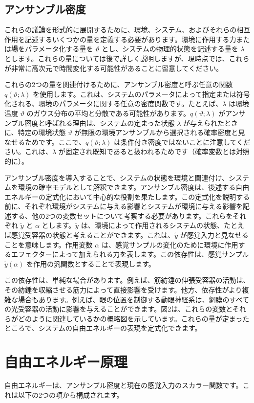 \documentclass{article}
\begin{document}
\subsection{アンサンブル密度}
これらの議論を形式的に展開するために、環境、システム、およびそれらの相互作用を記述するいくつかの量を定義する必要があります。環境に作用する力または場をパラメータ化する量を $\vartheta$ とし、システムの物理的状態を記述する量を $\lambda$ とします。これらの量については後で詳しく説明しますが、現時点では、これらが非常に高次元で時間変化する可能性があることに留意してください。

これらの2つの量を関連付けるために、アンサンブル密度と呼ぶ任意の関数 $q(\vartheta; \lambda)$ を使用します。これは、システムのパラメータによって指定または符号化される、環境のパラメータに関する任意の密度関数です。たとえば、$\lambda$ は環境温度 $\vartheta$ のガウス分布の平均と分散である可能性があります。$q(\vartheta; \lambda)$ がアンサンブル密度と呼ばれる理由は、システムの定まった状態 $\lambda$ が与えられたときに、特定の環境状態 $\vartheta$ が無限の環境アンサンブルから選択される確率密度と見なせるためです。ここで、$q(\vartheta; \lambda)$ は条件付き密度ではないことに注意してください。これは、$\lambda$ が固定され既知であると扱われるためです（確率変数とは対照的に）。

アンサンブル密度を導入することで、システムの状態を環境と関連付け、システムを環境の確率モデルとして解釈できます。アンサンブル密度は、後述する自由エネルギーの定式化において中心的な役割を果たします。この定式化を説明する前に、それぞれ環境がシステムに与える影響とシステムが環境に与える影響を記述する、他の2つの変数セットについて考察する必要があります。これらをそれぞれ $\tilde{y}$ と $\alpha$ とします。$\tilde{y}$ は、環境によって作用されるシステムの状態、たとえば感覚受容器の状態と考えることができます。これは、$\tilde{y}$ が感覚入力と見なせることを意味します。作用変数 $\alpha$ は、感覚サンプルの変化のために環境に作用するエフェクターによって加えられる力を表します。この依存性は、感覚サンプル $\tilde{y}(\alpha)$ を作用の汎関数とすることで表現します。

この依存性は、単純な場合があります。例えば、筋紡錘の伸張受容器の活動は、その紡錘を収縮させる筋力によって直接影響を受けます。他方、依存性がより複雑な場合もあります。例えば、眼の位置を制御する動眼神経系は、網膜のすべての光受容器の活動に影響を与えることができます。図2は、これらの変数とそれらがどのように関連しているかの概略図を示しています。これらの量が定まったところで、システムの自由エネルギーの表現を定式化できます。

\section{自由エネルギー原理}
自由エネルギーは、アンサンブル密度と現在の感覚入力のスカラー関数です。これは以下の2つの項から構成されます。
\end{document}
